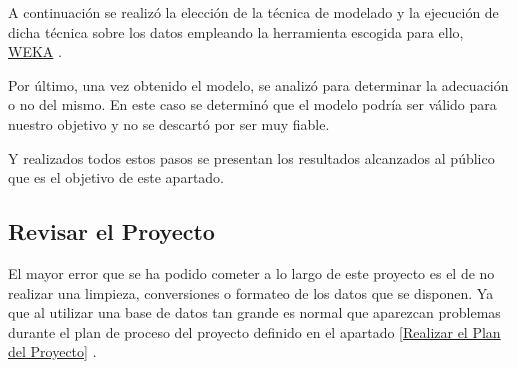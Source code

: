 \documentclass{article}
\begin{document}
A continuación se realizó la elección de la técnica de modelado y la ejecución de dicha técnica sobre los datos empleando la herramienta escogida para ello, \href{https://www.cs.waikato.ac.nz/~ml/weka/}{WEKA} .

Por último, una vez obtenido el modelo, se analizó para determinar la adecuación o no del mismo. En este caso se determinó que el modelo podría ser válido para nuestro objetivo y no se descartó por ser muy fiable.

Y realizados todos estos pasos se presentan los resultados alcanzados al público que es el objetivo de este apartado.
\subsection{Revisar el Proyecto}
El mayor error que se ha podido cometer a lo largo de este proyecto es el de no realizar una limpieza, conversiones o formateo de los datos que se disponen. Ya que al utilizar una base de datos tan grande es normal que aparezcan problemas durante el plan de proceso del proyecto definido en el apartado \ref{Realizar el Plan del Proyecto} . 
\end{document}
